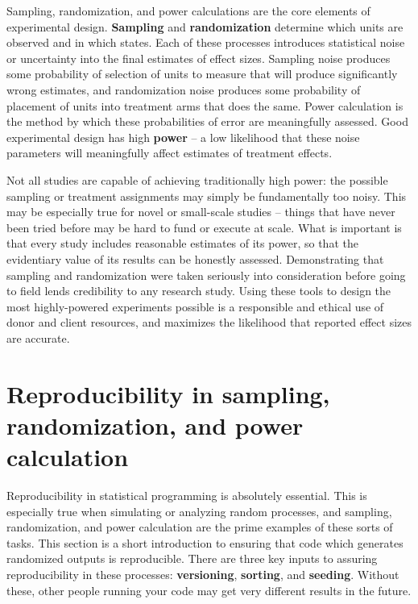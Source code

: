 
\begin{fullwidth}
Sampling, randomization, and power calculations are the core elements of experimental design.
\textbf{Sampling} and \textbf{randomization} determine
which units are observed and in which states.
Each of these processes introduces statistical noise
or uncertainty into the final estimates of effect sizes.
Sampling noise produces some probability of
selection of units to measure that will produce significantly wrong estimates, and
randomization noise produces some probability of
placement of units into treatment arms that does the same.
Power calculation is the method by which these probabilities of error are meaningfully assessed.
Good experimental design has high \textbf{power} -- a low likelihood that these noise parameters
will meaningfully affect estimates of treatment effects.

Not all studies are capable of achieving traditionally high power:
the possible sampling or treatment assignments may simply be fundamentally too noisy.
This may be especially true for novel or small-scale studies --
things that have never been tried before may be hard to fund or execute at scale.
What is important is that every study includes reasonable estimates of its power,
so that the evidentiary value of its results can be honestly assessed.
Demonstrating that sampling and randomization were taken seriously into consideration
before going to field lends credibility to any research study.
Using these tools to design the most highly-powered experiments possible
is a responsible and ethical use of donor and client resources,
and maximizes the likelihood that reported effect sizes are accurate.
\end{fullwidth}

\section{Reproducibility in sampling, randomization, and power calculation}

Reproducibility in statistical programming is absolutely essential.\cite{orozco2018make}
This is especially true when simulating or analyzing random processes,
and sampling, randomization, and power calculation
are the prime examples of these sorts of tasks.
This section is a short introduction to ensuring that code
which generates randomized outputs is reproducible.
There are three key inputs to assuring reproducibility in these processes:
\textbf{versioning}, \textbf{sorting}, and \textbf{seeding}.
Without these, other people running your code may get very different results in the future.

